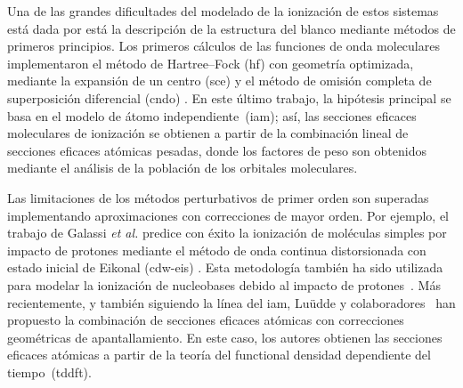 Una de las grandes dificultades del modelado de la ionización de estos 
sistemas está dada por está la descripción de la estructura del blanco
mediante métodos de primeros principios. Los primeros cálculos de las 
funciones de onda moleculares implementaron el método de Hartree--Fock
(\acs{hf}) con geometría optimizada, mediante la expansión de un centro 
(\acs{sce}) \cite{DalCappello:08} y el método de omisión completa de 
superposición diferencial (\acs{cndo}) \cite{Champion:10}. En este último 
trabajo, la hipótesis principal se basa en el modelo de átomo 
independiente~(\acs{iam}); así, las secciones eficaces moleculares de 
ionización se obtienen a partir de la combinación lineal de secciones 
eficaces atómicas pesadas, donde los factores de peso son obtenidos 
mediante el análisis de la población de los orbitales moleculares. 

Las limitaciones de los métodos perturbativos de primer orden son 
superadas implementando aproximaciones con correcciones de mayor orden. 
Por ejemplo, el trabajo de Galassi \textit{et al.} \cite{Galassi:00} 
predice con éxito la ionización de moléculas simples por impacto de 
protones mediante el método de onda continua distorsionada con estado 
inicial de Eikonal (\acs{cdw-eis}) \cite{Fainstein:88,Miraglia:08,
Miraglia:09}. Esta metodología también ha sido utilizada para modelar la 
ionización de nucleobases debido al impacto de protones~\cite{Galassi:12}.
Más recientemente, y también siguiendo la línea del \acs{iam}, Lu\"udde 
y colaboradores~\cite{Ludde:16,Ludde:18,Ludde:19,Ludde:20} han propuesto 
la combinación de secciones eficaces atómicas con correcciones 
geométricas de apantallamiento. En este caso, los autores obtienen las 
secciones eficaces atómicas a partir de la teoría del functional densidad 
dependiente del tiempo~(\acs{tddft}). 

